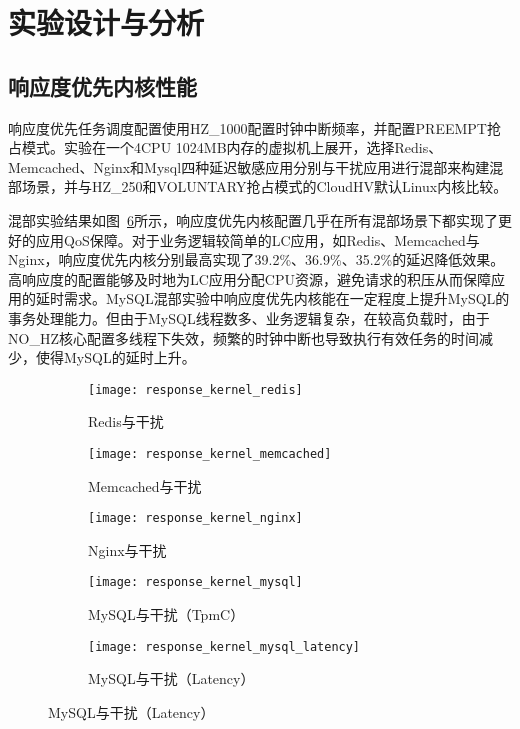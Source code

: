 
\section{实验设计与分析}

\subsection{响应度优先内核性能}


响应度优先任务调度配置使用HZ\_1000配置时钟中断频率，并配置PREEMPT抢占模式。实验在一个4CPU 1024MB内存的虚拟机上展开，选择Redis、Memcached、Nginx和Mysql四种延迟敏感应用分别与干扰应用进行混部来构建混部场景，并与HZ\_250和VOLUNTARY抢占模式的CloudHV默认Linux内核比较。

混部实验结果如图~\ref{fig:perf_response}所示，响应度优先内核配置几乎在所有混部场景下都实现了更好的应用QoS保障。对于业务逻辑较简单的LC应用，如Redis、Memcached与Nginx，响应度优先内核分别最高实现了39.2\%、36.9\%、35.2\%的延迟降低效果。高响应度的配置能够及时地为LC应用分配CPU资源，避免请求的积压从而保障应用的延时需求。MySQL混部实验中响应度优先内核能在一定程度上提升MySQL的事务处理能力。但由于MySQL线程数多、业务逻辑复杂，在较高负载时，由于NO\_HZ核心配置多线程下失效，频繁的时钟中断也导致执行有效任务的时间减少，使得MySQL的延时上升。

\begin{figure}[H]
    \centering
    \begin{subfigure}[b]{0.32\textwidth}
      \texttt{[image: response\_kernel\_redis]}
      \caption{Redis与干扰}
      \label{fig:response_kernel_redis}
    \end{subfigure}
    \begin{subfigure}[b]{0.32\textwidth}
      \texttt{[image: response\_kernel\_memcached]}
      \caption{Memcached与干扰}
      \label{fig:response_kernel_memcached}
    \end{subfigure}
    \begin{subfigure}[b]{0.32\textwidth}
        \texttt{[image: response\_kernel\_nginx]}
        \caption{Nginx与干扰}
        \label{fig:memcached_response}
      \end{subfigure}
      \begin{subfigure}[b]{0.32\textwidth}
        \texttt{[image: response\_kernel\_mysql]}
        \caption{MySQL与干扰（TpmC）}
        \label{fig:memcached_response}
      \end{subfigure}
      \begin{subfigure}[b]{0.32\textwidth}
        \texttt{[image: response\_kernel\_mysql\_latency]}
        \caption{MySQL与干扰（Latency）}
        \label{fig:memcached_response}
      \end{subfigure}
    \label{fig:perf_response}
\end{figure}

